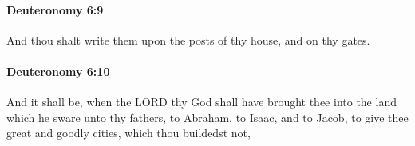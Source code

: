 		\paragraph{Deuteronomy 6:9} %
			\label{DEUTERONOMY-6-9}

			And thou shalt write them upon the posts of thy house, and on thy gates.


		\paragraph{Deuteronomy 6:10} %
			\label{DEUTERONOMY-6-10}

			And it shall be, when the LORD thy God shall have brought thee into the land which he sware unto thy fathers, to Abraham, to Isaac, and to Jacob, to give thee great and goodly cities, which thou buildedst not,


